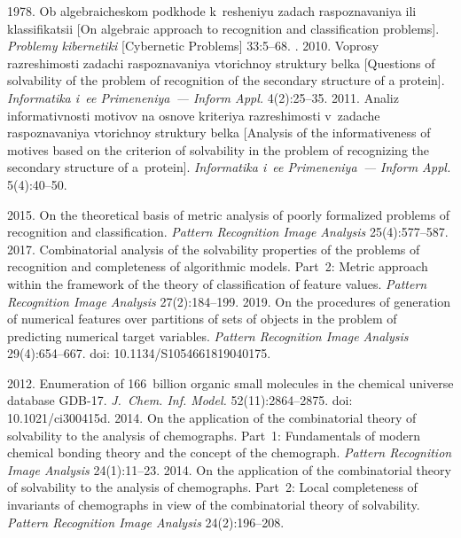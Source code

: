   \begin{multicols}{2}

\renewcommand{\bibname}{\protect\rmfamily References}

{\small\frenchspacing
 {%
 \begin{thebibliography}{99}
 1978. Ob algebraicheskom podkhode k~resheniyu zadach raspoznavaniya 
ili klassifikatsii [On algebraic approach to recognition and classification problems]. 
\textit{Problemy kibernetiki} [Cybernetic Problems] 33:5--68.
. 2010. Voprosy razreshimosti zadachi raspoznavaniya 
vtorichnoy struktury belka [Questions of solvability of the problem of recognition of the secondary 
structure of a protein]. \textit{Informatika i~ee Primeneniya~--- Inform Appl.} 4(2):25--35.
 2011. Analiz informativnosti motivov na osnove 
kriteriya razreshimosti v~zadache raspoznavaniya vtorichnoy struktury belka [Analysis of the 
informativeness of motives based on the criterion of solvability in the problem of recognizing the 
secondary structure of a~protein]. \textit{Informatika i~ee Primeneniya~--- Inform Appl.} 
5(4):40--50.

 2015. On the theoretical basis of metric analysis of 
poorly formalized problems of recognition and classification. \textit{Pattern Recognition Image 
Analysis} 25(4):577--587.
 2017. Combinatorial analysis of the solvability 
properties of the problems of recognition and completeness of algorithmic models. Part~2: Metric 
approach within the framework of the theory of classification of feature values. 
\textit{Pattern Recognition Image Analysis} 27(2):184--199. 
 2019. On the procedures of generation of numerical 
features over partitions of sets of objects in the problem of predicting numerical target variables. 
\textit{Pattern Recognition Image Analysis} 29(4):654--667.  doi: 10.1134/S1054661819040175.

 2012. Enumeration of 
166~billion organic small molecules in the chemical universe database GDB-17. \textit{J.~Chem. 
Inf. Model.} 52(11):2864--2875.  doi: 10.1021/ci300415d.
 2014. On the application of the combinatorial theory 
of solvability to the analysis of chemographs. Part~1: Fundamentals of modern chemical bonding 
theory and the concept of the chemograph. \textit{Pattern Recognition Image Analysis} 24(1):11--23. 
 2014. On the application of the combinatorial theory 
of solvability to the analysis of chemographs. Part~2: Local completeness of invariants of 
chemographs in view of the combinatorial theory of solvability. \textit{Pattern Recognition Image 
Analysis} 24(2):196--208.


\end{thebibliography}}}
\end{multicols}
